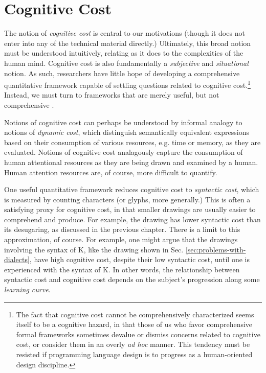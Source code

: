 
\section{Cognitive Cost}\label{sec:syntactic-properties}
The notion of \emph{cognitive cost} is central to our motivations (though it does not enter into any of the technical material directly.) Ultimately, this broad notion must be understood intuitively, relating as it does to the complexities of the human mind. Cognitive cost is also fundamentally a \emph{subjective} and \emph{situational} notion. As such, researchers have little hope of developing a comprehensive quantitative framework capable of settling questions related to cognitive cost.\footnote{The fact that cognitive cost cannot be comprehensively characterized seems itself to be a cognitive hazard, in that those of us who favor comprehensive formal frameworks sometimes devalue or dismiss concerns related to cognitive cost, or consider them in an overly \emph{ad hoc} manner. This tendency must be resisted if programming language design is to progress as a human-oriented design discipline.} Instead, we must turn to frameworks that are merely useful, but not comprehensive \cite{box1987empirical}. %

Notions of cognitive cost can perhaps be understood by informal analogy to notions of \emph{dynamic cost}, which distinguish semantically equivalent expressions based on their consumption of various resources, e.g. time or memory, as they are evaluated. Notions of cognitive cost analagously capture the consumption of human attentional resources as they are being drawn and examined by a human. Human attention resources are, of course, more difficult to quantify.


One useful quantitative framework reduces cognitive cost to \emph{syntactic cost}, which is measured by counting characters (or glyphs, more generally.) This is often a satisfying proxy for cognitive cost, in that smaller drawings are usually easier to comprehend and produce. For example, the drawing \li{[1, 2, 3, 4, 5]} has lower syntactic cost than its desugaring, as discussed in the previous chapter. There is a limit to this approximation, of course. For example, one might argue that the drawings involving the syntax of K, like the drawing shown in Sec. \ref{sec:problems-with-dialects}, have high cognitive cost, despite their low syntactic cost, until one is experienced with the syntax of K. In other words, the relationship between syntactic cost and cognitive cost depends on the subject's progression along some \emph{learning curve}.

